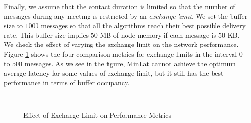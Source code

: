 \documentclass[journal,onecolumn,11pt]{IEEEtran}
\theoremstyle{plain}
\theoremstyle{definition}
\begin{document}
Finally, we assume that the contact duration is limited so that the
number of messages during any meeting is restricted by an
{\em exchange limit}. We set the buffer size to
$1000$ messages so that all the algorithms reach their best possible
delivery rate. This 
buffer size implies $50$ MB of node memory if each
message is $50$ KB. We check the effect of varying the exchange limit on the
network performance. Figure \ref{fig:res_exchange} shows the four
comparison metrics for exchange limits in the interval $0$ to $500$
messages. As we see in the figure, MinLat cannot achieve the optimum
average latency for some values of exchange limit, but it still has
the best performance in terms of buffer occupancy.
\begin{figure}[!htb]
\centering
\hspace*{0.03in}\hspace*{0 in}
\\
\hspace*{0.03in}\hspace*{0in}
\caption{Effect of Exchange Limit on Performance Metrics}
\label{fig:res_exchange}
\end{figure}
\end{document}
